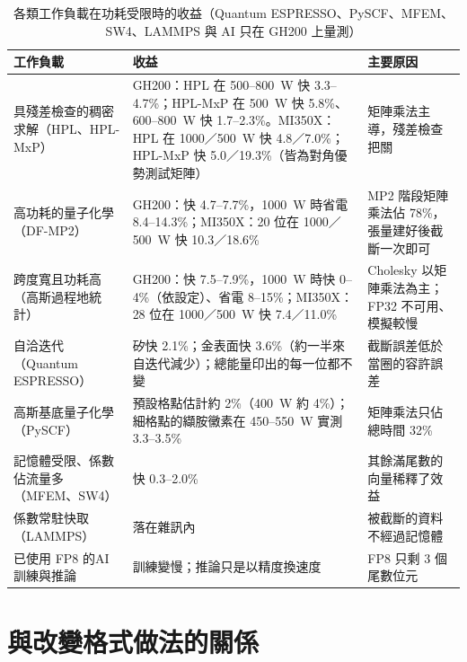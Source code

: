 \begin{table}[tbp]
\centering
\caption[各類工作負載在功耗受限時的收益]{各類工作負載在功耗受限時的收益（Quantum ESPRESSO、PySCF、MFEM、SW4、LAMMPS 與 AI 只在 GH200 上量測）}\label{tab:summary}
\small
\begin{tabularx}{\textwidth}{@{}>{\raggedright\arraybackslash}p{3.6cm}LL@{}}
\toprule
工作負載 & 收益 & 主要原因 \\
\midrule
具殘差檢查的\newline 稠密求解\newline（HPL、HPL-MxP） & GH200：HPL 在 500–800~W 快 3.3–4.7\%；HPL-MxP 在 500~W 快 5.8\%、600–800~W 快 1.7–2.3\%。MI350X：HPL 在 1000／500~W 快 4.8／7.0\%；HPL-MxP 快 5.0／19.3\%（皆為對角優勢測試矩陣） & 矩陣乘法主導，殘差檢查把關 \\ \addlinespace[2pt]
高功耗的量子化學（DF-MP2） & GH200：快 4.7–7.7\%，1000~W 時省電 8.4–14.3\%；MI350X：20 位在 1000／500~W 快 10.3／18.6\% & MP2 階段矩陣乘法佔 78\%，張量建好後截斷一次即可 \\ \addlinespace[2pt]
跨度寬且功耗高\newline（高斯過程地統計） & GH200：快 7.5–7.9\%，1000~W 時快 0–4\%（依設定）、省電 8–15\%；MI350X：28 位在 1000／500~W 快 7.4／11.0\% & Cholesky 以矩陣乘法為主；FP32 不可用、模擬較慢 \\ \addlinespace[2pt]
自洽迭代（Quantum ESPRESSO） & 矽快 2.1\%；金表面快 3.6\%（約一半來自迭代減少）；總能量印出的每一位都不變 & 截斷誤差低於當圈的容許誤差 \\ \addlinespace[2pt]
高斯基底量子化學（PySCF） & 預設格點估計約 2\%（400~W 約 4\%）；細格點的纈胺黴素在 450–550~W 實測 3.3–3.5\% & 矩陣乘法只佔總時間 32\% \\ \addlinespace[2pt]
記憶體受限、\newline 係數佔流量多\newline（MFEM、SW4） & 快 0.3–2.0\% & 其餘滿尾數的向量稀釋了效益 \\ \addlinespace[2pt]
係數常駐快取（LAMMPS） & 落在雜訊內 & 被截斷的資料不經過記憶體 \\ \addlinespace[2pt]
已使用 FP8 的\newline AI 訓練與推論 & 訓練變慢；推論只是以精度換速度 & FP8 只剩 3 個尾數位元 \\
\bottomrule
\end{tabularx}
\end{table}

\section{與改變格式做法的關係}\label{sec:vs-formats}

